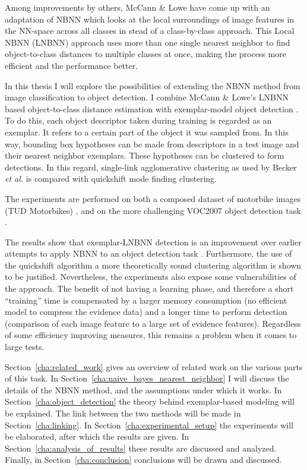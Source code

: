 Among improvements by others, McCann \& Lowe \cite{mccann2012local} have come up with an adaptation of NBNN which looks at the local surroundings of image features in the NN-space across all classes in stead of a class-by-class approach. This Local NBNN (LNBNN) approach uses more than one single nearest neighbor to find object-to-class distances to multiple classes at once, making the process more efficient and the performance better. 

In this thesis I will explore the possibilities of extending the NBNN method from image classification to object detection. I combine McCann \& Lowe's LNBNN based object-to-class distance estimation with exemplar-model object detection \cite{becker2012codebook, chum2007exemplar}. To do this, each object descriptor taken during training is regarded as an exemplar. It refers to a certain part of the object it was sampled from. In this way, bounding box hypotheses can be made from descriptors in a test image and their nearest neighbor exemplars. These hypotheses can be clustered to form detections. In this regard, single-link agglomerative clustering as used by Becker \emph{et al.} \cite{becker2012codebook} is compared with quickshift mode finding clustering. \cite{vedaldi2008quick}

The experiments are performed on both a composed dataset of motorbike images (TUD Motorbikes) \cite{becker2012codebook, fritz2005integrating}, and on the more challenging VOC2007 object detection task \cite{pascal-voc-2007}.

The results show that exemplar-LNBNN detection is an improvement over earlier attempts to apply NBNN to an object detection task \cite{becker2012codebook}. Furthermore, the use of the quickshift algorithm a more theoretically sound clustering algorithm is shown to be justified. Nevertheless, the experiments also expose some vulnerabilities of the approach. The benefit of not having a learning phase, and therefore a short ``training'' time is compensated by a larger memory consumption (no efficient model to compress the evidence data) and a longer time to perform detection (comparison of each image feature to a large set of evidence features). Regardless of some efficiency improving measures, this remains a problem when it comes to large tests.

Section~\ref{cha:related_work} gives an overview of related work on the various parts of this task. In Section~\ref{cha:naive_bayes_nearest_neighbor} I will discuss the details of the NBNN method, and the assumptions under which it works. In Section~\ref{cha:object_detection} the theory behind exemplar-based modeling will be explained. The link between the two methods will be made in Section~\ref{cha:linking}. In Section~\ref{cha:experimental_setup} the experiments will be elaborated, after which the results are given. In Section~\ref{cha:analysis_of_results} these results are discussed and analyzed. Finally, in Section~\ref{cha:conclusion} conclusions will be drawn and discussed.

